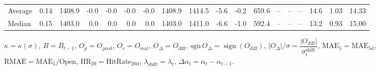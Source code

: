 \begin{threeparttable}
{\begin{tabular}{lrrrrrrrrrrrrrrrrr}
Average &     0.14 & 1408.9 &              -0.0 &              -0.0 &               -0.0 &               -0.0 & 1408.9 & 1414.5 &       -5.6 &                     -0.2 &               659.6 &         -- &        -- &             -- &             14.6 &            1.03 &                  14.33 \\
 Median &     0.15 & 1403.0 &               0.0 &               0.0 &                0.0 &                0.0 & 1403.0 & 1411.0 &       -6.6 &                     -1.0 &               592.4 &         -- &        -- &             -- &             13.2 &            0.93 &                  15.00 \\
\bottomrule
\end{tabular}
}
\begin{tablenotes}\footnotesize
\item $\kappa=\kappa(\sigma)$, $B=B_{t-1}$, $O_p=O_{\text{pred}}$, $O_r=O_{\text{real}}$, $O_\Delta=O_{\text{diff}}$, $\mathrm{sgn}\,O_\Delta=\operatorname{sign}(O_{\text{diff}})$, $|O_\Delta|/\sigma=\dfrac{|O_{\text{diff}}|}{\sigma_t^{\text{shift}}}$, $\mathrm{MAE}_5=\mathrm{MAE}_{5\text{d}}$, $\mathrm{RMAE}= \mathrm{MAE}_5 / \text{Open}$, $\mathrm{HR}_{20}=\mathrm{HitRate}_{20\text{d}}$, 
$\lambda_{\text{shift}}=\lambda_t$, 
$\Delta\alpha_t=\alpha_t-\alpha_{t-1}$.
\end{tablenotes}
\end{threeparttable}
\endgroup

